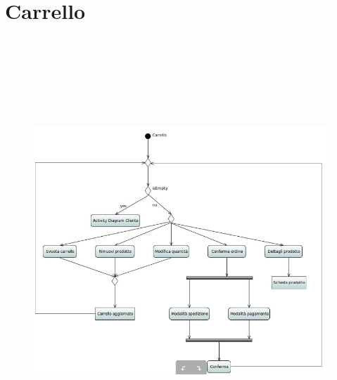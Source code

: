 \documentclass[a4paper,12pt]{report}
\begin{document}
	\section*{Carrello}
	\begin{figure}[h]
		\centering
		\includegraphics[width=\textwidth, height=16cm]{Activity_Carrello}
	\end{figure}
	
	\newpage
\end{document}
